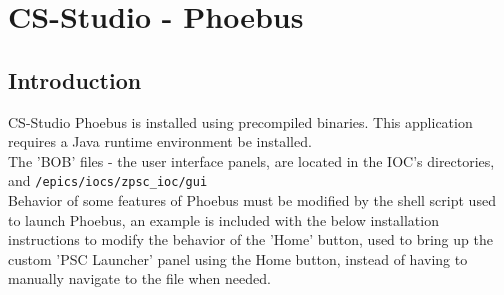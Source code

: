 \chapter{CS-Studio - Phoebus}
\label{chap:cs-studio}

\section{Introduction}
CS-Studio Phoebus is installed using precompiled binaries. This application requires a Java runtime environment be installed.\\

\noindent The 'BOB' files - the user interface panels, are located in the IOC's directories,  and \texttt{/epics/iocs/zpsc\_ioc/gui}\\

\noindent Behavior of some features of Phoebus must be modified by the shell script used to launch Phoebus, an example is included with the below installation instructions to modify the behavior of the 'Home' button, used to bring up the custom 'PSC Launcher' panel using the Home button, instead of having to manually navigate to the file when needed.\\


